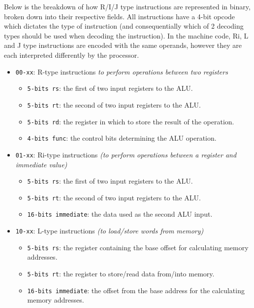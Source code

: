 \label{sec:MachineCodeEncoding}
Below is the breakdown of how R/I/J type instructions are represented in binary, broken down into their respective fields. All instructions have a 4-bit opcode which dictates the type of instruction (and consequentially which of 2 decoding types should be used when decoding the instruction). In the machine code, Ri, L and J type instructions are encoded with the same operands, however they are each interpreted differently by the processor. 

\begin{itemize}
    \item \texttt{00-xx}: R-type instructions \textit{to perform operations between two registers}
        \begin{itemize}
            \item \texttt{5-bits rs}: the first of two input registers to the ALU.
            \item \texttt{5-bits rt}: the second of two input registers to the ALU.
            \item \texttt{5-bits rd}: the register in  which to store the result of the operation.
            \item \texttt{4-bits func}: the control bits determining the ALU operation.
        \end{itemize}
    \item \texttt{01-xx}: Ri-type instructions \textit{(to perform operations between a register and immediate value)}
        \begin{itemize}
            \item \texttt{5-bits rs}: the first of two input registers to the ALU.
            \item \texttt{5-bits rt}: the second of two input registers to the ALU.
            \item \texttt{16-bits immediate}: the data used as the second ALU input.
        \end{itemize}
    \item \texttt{10-xx}: L-type instructions \textit{(to load/store words from memory)}
        \begin{itemize}
            \item \texttt{5-bits rs}: the register containing the base offset for calculating memory addresses.
            \item \texttt{5-bits rt}: the register to store/read data from/into memory.
            \item \texttt{16-bits immediate}: the offset from the base address for the calculating memory addresses.

\end{itemize}
\end{itemize}
